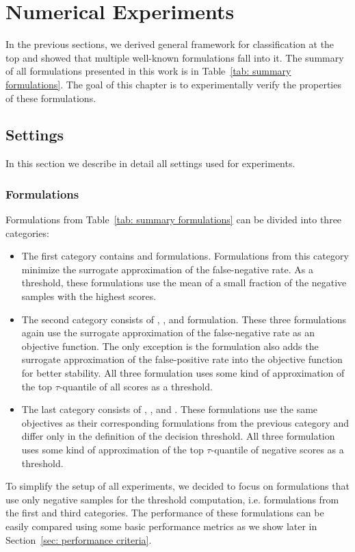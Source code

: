 \chapter{Numerical Experiments}\label{chap: experiments}

In the previous sections, we derived general framework for classification at the top and showed that multiple well-known formulations fall into it. The summary of all formulations presented in this work is in Table~\ref{tab: summary formulations}. The goal of this chapter is to experimentally verify the properties of these formulations. 

\section{Settings}\label{sec: settings}

In this section we describe in detail all settings used for experiments. 

\subsection{Formulations}

Formulations from Table~\ref{tab: summary formulations} can be divided into three categories:
\begin{itemize}
  \item The first category contains \TopPush and \TopPushK formulations. Formulations from this category minimize the surrogate approximation of the false-negative rate. As a threshold, these formulations use the mean of a small fraction of the negative samples with the highest scores.
  \item The second category consists of \Grill, \TopMeanK, and \PatMat formulation. These three formulations again use the surrogate approximation of the false-negative rate as an objective function. The only exception is the \Grill formulation also adds the surrogate approximation of the false-positive rate into the objective function for better stability. All three formulation uses some kind of approximation of the top $\tau$-quantile of all scores as a threshold.
  \item The last category consists of \GrillNP, \tauFPL, and \PatMatNP. These formulations use the same objectives as their corresponding formulations from the previous category and differ only in the definition of the decision threshold. All three formulation uses some kind of approximation of the top $\tau$-quantile of negative scores as a threshold.
\end{itemize}
To simplify the setup of all experiments, we decided to focus on formulations that use only negative samples for the threshold computation, i.e. formulations from the first and third categories. The performance of these formulations can be easily compared using some basic performance metrics as we show later in Section~\ref{sec: performance criteria}.

